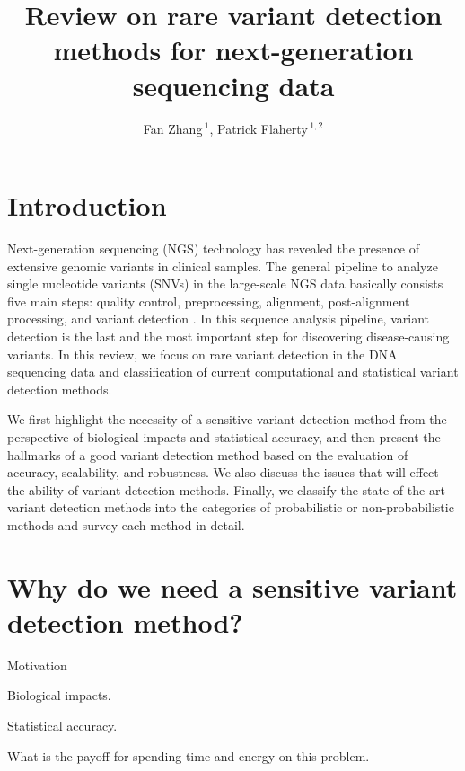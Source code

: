 \documentclass[11pt,reqno]{amsart}
\title[Reveiw on RVD Methods]{Review on rare variant detection methods for next-generation sequencing data}
\author[F. Zhang AND P. Flaherty]{Fan Zhang\,$^{1}$, Patrick Flaherty\,$^{1,2}$}
\begin{document}
\maketitle

\section{Introduction}

Next-generation sequencing (NGS) technology has revealed the presence of extensive genomic variants in clinical samples.
The general pipeline to analyze single nucleotide variants (SNVs) in the large-scale NGS data basically consists five main steps: quality control, preprocessing, alignment, post-alignment processing, and variant detection \citep{Bao2014}.
In this sequence analysis pipeline, variant detection is the last and the most important step for discovering disease-causing variants.
In this review, we focus on rare variant detection in the DNA sequencing data and classification of current computational and statistical variant detection methods.

We first highlight the necessity of a sensitive variant detection method from the perspective of biological impacts and statistical accuracy,
and then present the hallmarks of a good variant detection method based on the evaluation of accuracy, scalability, and robustness.
We also discuss the issues that will effect the ability of variant detection methods.
Finally, we classify the state-of-the-art variant detection methods into the categories of probabilistic or non-probabilistic methods and survey each method in detail.


\section{Why do we need a sensitive variant detection method?}

Motivation

Biological impacts.

Statistical accuracy.

What is the payoff for spending time and energy on this problem.
\end{document}

